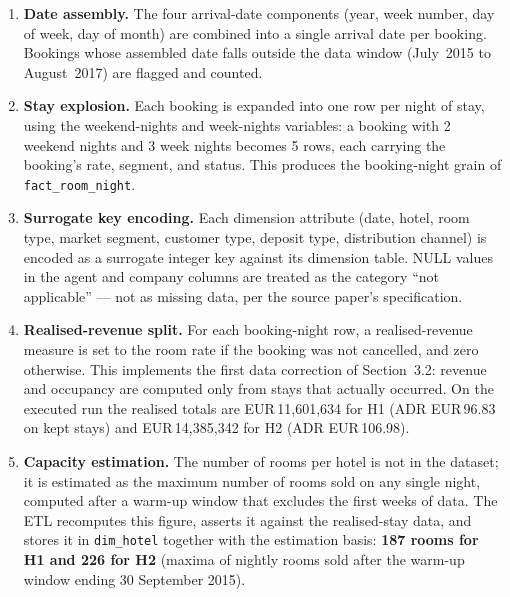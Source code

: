 \begin{enumerate}
  \item \textbf{Date assembly.} The four arrival-date components (year, week number, day of week, day of month) are combined into a single arrival date per booking. Bookings whose assembled date falls outside the data window (July~2015 to August~2017) are flagged and counted.
  \item \textbf{Stay explosion.} Each booking is expanded into one row per night of stay, using the weekend-nights and week-nights variables: a booking with 2 weekend nights and 3 week nights becomes 5 rows, each carrying the booking's rate, segment, and status. This produces the booking-night grain of \texttt{fact\_room\_night}.
  \item \textbf{Surrogate key encoding.} Each dimension attribute (date, hotel, room type, market segment, customer type, deposit type, distribution channel) is encoded as a surrogate integer key against its dimension table. NULL values in the agent and company columns are treated as the category ``not applicable'' --- not as missing data, per the source paper's specification.
  \item \textbf{Realised-revenue split.} For each booking-night row, a realised-revenue measure is set to the room rate if the booking was not cancelled, and zero otherwise. This implements the first data correction of Section~3.2: revenue and occupancy are computed only from stays that actually occurred. On the executed run the realised totals are EUR\,11{,}601{,}634 for H1 (ADR EUR\,96.83 on kept stays) and EUR\,14{,}385{,}342 for H2 (ADR EUR\,106.98).
  \item \textbf{Capacity estimation.} The number of rooms per hotel is not in the dataset; it is estimated as the maximum number of rooms sold on any single night, computed after a warm-up window that excludes the first weeks of data. The ETL recomputes this figure, asserts it against the realised-stay data, and stores it in \texttt{dim\_hotel} together with the estimation basis: \textbf{187 rooms for H1 and 226 for H2} (maxima of nightly rooms sold after the warm-up window ending 30 September 2015).
\end{enumerate}

